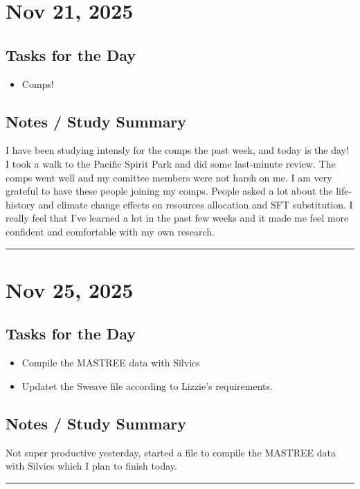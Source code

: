 \documentclass[12pt]{article}
\begin{document}
\section*{Nov 21, 2025}

\subsection*{Tasks for the Day}
\begin{itemize}
    \item Comps!
\end{itemize}
\subsection*{Notes / Study Summary}
I have been studying intensly for the comps the past week, and today is the day! I took a walk to the Pacific Spirit Park and did some last-minute review. The comps went well and my comittee members were not harsh on me. I am very grateful to have these people joining my comps. People asked a lot about the life-history and climate change effects on resources allocation and SFT substitution. I really feel that I've learned a lot in the past few weeks and it made me feel more confident and comfortable with my own research.
\vspace{1em}
\hrule
\vspace{1em}

\section*{Nov 25, 2025}

\subsection*{Tasks for the Day}
\begin{itemize}
    \item Compile the MASTREE data with Silvics
    \item Updatet the Sweave file according to Lizzie's requirements.
\end{itemize}
\subsection*{Notes / Study Summary}
Not super productive yesterday, started a file to compile the MASTREE data with Silvics which I plan to finish today.
\vspace{1em}
\hrule
\vspace{1em}
\end{document}
